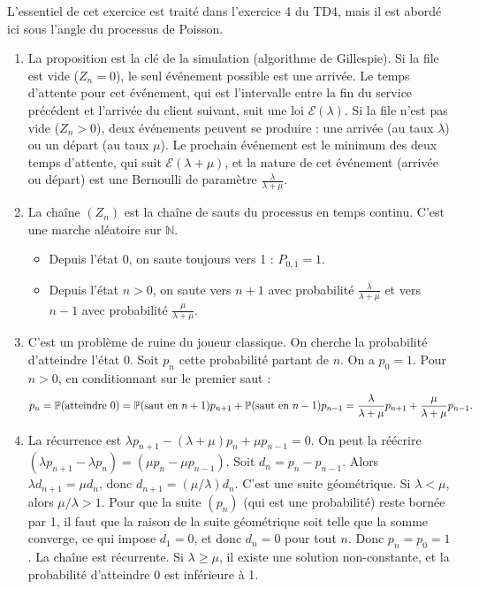 \documentclass[solutions]{exercices}
\begin{document}
\begin{solution}
L'essentiel de cet exercice est traité dans l'exercice 4 du TD4, mais il est abordé ici sous l'angle du processus de Poisson.
\begin{enumerate}
    \item La proposition est la clé de la simulation (algorithme de Gillespie). Si la file est vide ($Z_n=0$), le seul événement possible est une arrivée. Le temps d'attente pour cet événement, qui est l'intervalle entre la fin du service précédent et l'arrivée du client suivant, suit une loi $\mathcal{E}(\lambda)$. Si la file n'est pas vide ($Z_n>0$), deux événements peuvent se produire : une arrivée (au taux $\lambda$) ou un départ (au taux $\mu$). Le prochain événement est le minimum des deux temps d'attente, qui suit $\mathcal{E}(\lambda+\mu)$, et la nature de cet événement (arrivée ou départ) est une Bernoulli de paramètre $\frac{\lambda}{\lambda+\mu}$.
    \item La chaîne $(Z_n)$ est la chaîne de sauts du processus en temps continu. C'est une marche aléatoire sur $\mathbb{N}$.
    \begin{itemize}
        \item Depuis l'état 0, on saute toujours vers 1 : $P_{0,1}=1$.
        \item Depuis l'état $n > 0$, on saute vers $n+1$ avec probabilité $\frac{\lambda}{\lambda+\mu}$ et vers $n-1$ avec probabilité $\frac{\mu}{\lambda+\mu}$.
    \end{itemize}
    \item C'est un problème de ruine du joueur classique. On cherche la probabilité d'atteindre l'état 0. Soit $p_n$ cette probabilité partant de $n$. On a $p_0=1$. Pour $n>0$, en conditionnant sur le premier saut :
    \[ p_n = \P(\text{atteindre } 0) = \P(\text{saut en } n+1)p_{n+1} + \P(\text{saut en } n-1)p_{n-1} = \frac{\lambda}{\lambda+\mu}p_{n+1} + \frac{\mu}{\lambda+\mu}p_{n-1}. \]
    \item La récurrence est $\lambda p_{n+1} - (\lambda+\mu)p_n + \mu p_{n-1} = 0$. On peut la réécrire $(\lambda p_{n+1} - \lambda p_n) = (\mu p_n - \mu p_{n-1})$. Soit $d_n = p_n - p_{n-1}$. Alors $\lambda d_{n+1} = \mu d_n$, donc $d_{n+1} = (\mu/\lambda)d_n$. C'est une suite géométrique. Si $\lambda < \mu$, alors $\mu/\lambda > 1$. Pour que la suite $(p_n)$ (qui est une probabilité) reste bornée par 1, il faut que la raison de la suite géométrique soit telle que la somme converge, ce qui impose $d_1=0$, et donc $d_n=0$ pour tout $n$. Donc $p_n = p_0 = 1$. La chaîne est récurrente. Si $\lambda \ge \mu$, il existe une solution non-constante, et la probabilité d'atteindre 0 est inférieure à 1.

\end{enumerate}
\end{solution}
\end{document}
